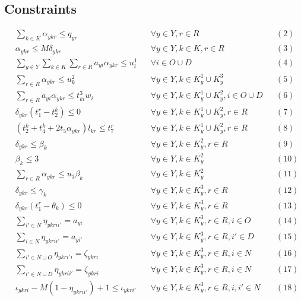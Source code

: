 \documentclass[11pt]{article}
\begin{document}
\subsection*{Constraints}
\[
\begin{aligned}
& \sum_{k \in K} \alpha_{ykr} \leq q_{yr} && \forall y \in Y, r \in R && (2) \\
& \alpha_{ykr} \leq M \delta_{ykr} && \forall y \in Y, k \in K, r \in R && (3) \\
& \sum_{y \in Y} \sum_{k \in K} \sum_{r \in R} a_{yi} \alpha_{ykr} \leq u_i^1 && \forall i \in O \cup D && (4) \\
& \sum_{r \in R} \alpha_{ykr} \leq u_k^2 && \forall y \in Y, k \in K^1_y \cup K^3_y && (5) \\
& \sum_{r \in R} a_{yi} \alpha_{ykr} \leq t_{ki}^3 w_i && \forall y \in Y, k \in K^1_y \cup K^2_y, i \in O \cup D && (6) \\
& \delta_{ykr} (t_1^r - t_2^k) \leq 0 && \forall y \in Y, k \in K^1_y \cup K^2_y, r \in R && (7) \\
& (t_2^k + t_4^k + 2 t_5 \alpha_{ykr}) l_{kr} \leq t_7^r && \forall y \in Y, k \in K^1_y \cup K^2_y, r \in R && (8) \\
& \delta_{ykr} \leq \beta_k && \forall y \in Y, k \in K^2_y, r \in R && (9) \\
& \beta_k \leq 3 && \forall y \in Y, k \in K^2_y && (10) \\
& \sum_{r \in R} \alpha_{ykr} \leq u_3 \beta_k && \forall y \in Y, k \in K^2_y && (11) \\
& \delta_{ykr} \leq \gamma_k && \forall y \in Y, k \in K^3_y, r \in R && (12) \\
& \delta_{ykr} (t_1^r - \theta_k) \leq 0 && \forall y \in Y, k \in K^3_y, r \in R && (13) \\
& \sum_{i' \in N} \eta_{ykrii'} = a_{yi} && \forall y \in Y, k \in K^3_y, r \in R, i \in O && (14) \\
& \sum_{i \in N} \eta_{ykrii'} = a_{yi'} && \forall y \in Y, k \in K^3_y, r \in R, i' \in D && (15) \\
& \sum_{i' \in N \cup O} \eta_{ykri'i} = \zeta_{ykri} && \forall y \in Y, k \in K^3_y, r \in R, i \in N && (16) \\
& \sum_{i' \in N \cup D} \eta_{ykrii'} = \zeta_{ykri} && \forall y \in Y, k \in K^3_y, r \in R, i \in N && (17) \\
& \iota_{ykri} - M (1 - \eta_{ykrii'}) + 1 \leq \iota_{ykri'} && \forall y \in Y, k \in K^3_y, r \in R, i, i' \in N && (18) \\

\end{aligned}\]
\end{document}
